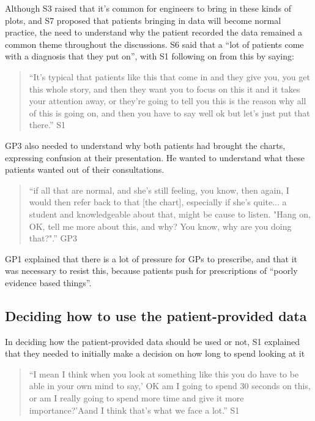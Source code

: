 \documentclass{sigchi}
\begin{document}
Although S3 raised that it’s common for engineers to bring in these kinds of plots, and S7 proposed that patients bringing in data will become normal practice, the need to understand why the patient recorded the data remained a common theme throughout the discussions. S6 said that a ``lot of patients come with a diagnosis that they put on'', with S1 following on from this by saying:

\begin{quote}
    ``It's typical that patients like this that come in and they give you, you get this whole story, and then they want you to focus on this it and it takes your attention away, or they're going to tell you this is the reason why all of this is going on, and then you have to say well ok but let's just put that there.'' S1
\end{quote}

GP3 also needed to understand why both patients had brought the charts, expressing confusion at their presentation. He wanted to understand what these patients wanted out of their consultations.

\begin{quote}
    ``if all that are normal, and she's still feeling, you know, then again, I would then refer back to that [the chart], especially if she's quite... a student and knowledgeable about that, might be cause to listen. "Hang on, OK, tell me more about this, and why? You know, why are you doing that?".'' GP3
\end{quote}

GP1 explained that there is a lot of pressure for GPs to prescribe, and that it was necessary to resist this, because patients push for prescriptions of ``poorly evidence based things''. 

\subsection{Deciding how to use the patient-provided data}

In deciding how the patient-provided data should be used or not, S1 explained that they needed to initially make a decision on how long to spend looking at it

\begin{quote}
``I mean I think when you look at something like this you do have to be able in your own mind to say,’ OK am I going to spend 30 seconds on this, or am I really going to spend more time and give it more importance?’Aand I think that's what we face a lot.'' S1
\end{quote}
\end{document}
